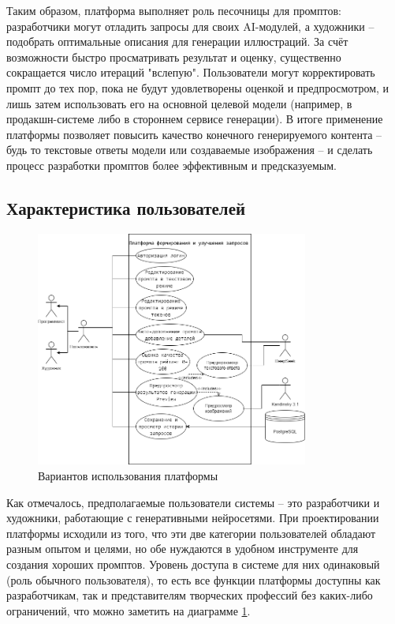 Таким образом, платформа выполняет роль песочницы для промптов: разработчики могут отладить запросы для своих AI-модулей, а художники – подобрать оптимальные описания для генерации иллюстраций. За счёт возможности быстро просматривать результат и оценку, существенно сокращается число итераций "вслепую". Пользователи могут корректировать промпт до тех пор, пока не будут удовлетворены оценкой и предпросмотром, и лишь затем использовать его на основной целевой модели (например, в продакшн-системе либо в стороннем сервисе генерации). В итоге применение платформы позволяет повысить качество конечного генерируемого контента – будь то текстовые ответы модели или создаваемые изображения – и сделать процесс разработки промптов более эффективным и предсказуемым.

\subsection{Характеристика пользователей}
\begin{figure}[htbp]
    \centering
    \includegraphics[width=0.8\textwidth]{picture/Диплом use case.png}
    \caption{Вариантов использования платформы}
    \label{usecase}
\end{figure}
Как отмечалось, предполагаемые пользователи системы – это разработчики и художники, работающие с генеративными нейросетями. При проектировании платформы исходили из того, что эти две категории пользователей обладают разным опытом и целями, но обе нуждаются в удобном инструменте для создания хороших промптов. Уровень доступа в системе для них одинаковый (роль обычного пользователя), то есть все функции платформы доступны как разработчикам, так и представителям творческих профессий без каких-либо ограничений, что можно заметить на диаграмме \ref{usecase}.

